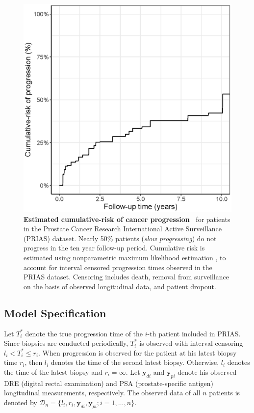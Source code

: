 \begin{figure}
\captionsetup{justification=justified}
\centerline{\includegraphics[width=\columnwidth]{images/npmle_plot.eps}}
\caption{\textbf{Estimated cumulative-risk of cancer progression~\citep{tomer2020webapp}} for patients in the Prostate Cancer Research International Active Surveillance (PRIAS) dataset. Nearly 50\% patients (\textit{slow progressing}) do not progress in the ten year follow-up period. Cumulative risk is estimated using nonparametric maximum likelihood estimation \citep{turnbull1976empirical}, to account for interval censored progression times observed in the PRIAS dataset. Censoring includes death, removal from surveillance on the basis of observed longitudinal data, and patient dropout.}
\label{fig:npmle_plot}
\end{figure}

\subsection{Model Specification}
Let $T_i^*$ denote the true progression time of the ${i\mbox{-th}}$ patient included in PRIAS. Since biopsies are conducted periodically, $T_i^*$ is observed with interval censoring ${l_i < T_i^* \leq r_i}$. When progression is observed for the patient at his latest biopsy time $r_i$, then $l_i$ denotes the time of the second latest biopsy. Otherwise, $l_i$ denotes the time of the latest biopsy and ${r_i=\infty}$. Let $\boldsymbol{y}_{di}$ and $\boldsymbol{y}_{pi}$ denote his observed DRE (digital rectal examination) and PSA (prostate-specific antigen) longitudinal measurements, respectively. The observed data of all $n$ patients is denoted by ${\mathcal{D}_n = \{l_i, r_i, \boldsymbol{y}_{di}, \boldsymbol{y}_{pi}; i = 1, \ldots, n\}}$.

